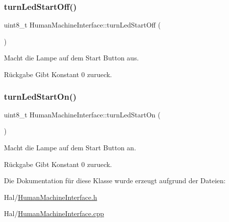 \subsubsection{\texorpdfstring{turn\+Led\+Start\+Off()}{turnLedStartOff()}}
{\footnotesize\ttfamily uint8\+\_\+t Human\+Machine\+Interface\+::turn\+Led\+Start\+Off (\begin{DoxyParamCaption}{ }\end{DoxyParamCaption})}

Macht die Lampe auf dem Start Button aus.

\begin{DoxyReturn}{Rückgabe}
Gibt Konstant 0 zurueck. 
\end{DoxyReturn}
\hypertarget{class_human_machine_interface_a46dca7b3435dc4b20a2db67b301cb36d}{}\label{class_human_machine_interface_a46dca7b3435dc4b20a2db67b301cb36d} 
\subsubsection{\texorpdfstring{turn\+Led\+Start\+On()}{turnLedStartOn()}}
{\footnotesize\ttfamily uint8\+\_\+t Human\+Machine\+Interface\+::turn\+Led\+Start\+On (\begin{DoxyParamCaption}{ }\end{DoxyParamCaption})}

Macht die Lampe auf dem Start Button an.

\begin{DoxyReturn}{Rückgabe}
Gibt Konstant 0 zurueck. 
\end{DoxyReturn}


Die Dokumentation für diese Klasse wurde erzeugt aufgrund der Dateien\+:\begin{DoxyCompactItemize}
\item 
Hal/\hyperlink{_human_machine_interface_8h}{Human\+Machine\+Interface.\+h}\item 
Hal/\hyperlink{_human_machine_interface_8cpp}{Human\+Machine\+Interface.\+cpp}\end{DoxyCompactItemize}
